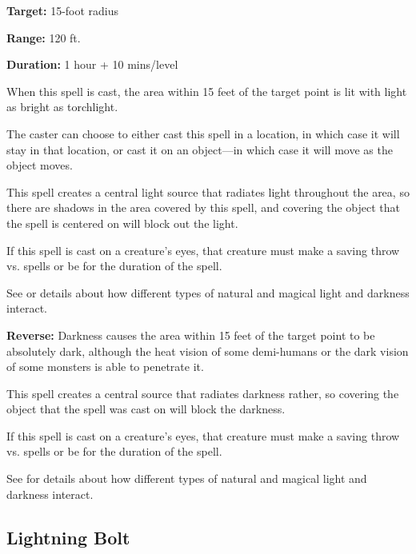 \begin{multicols*}{2}
{\textbf{Target:} 15-foot radius

\textbf{Range:} 120 ft.

\textbf{Duration:} 1 hour + 10 mins/level}

When this spell is cast, the area within 15 feet of the target point is lit with light as bright as torchlight.

The caster can choose to either cast this spell in a location, in which case it will stay in that location, or cast it on an object—in which case it will move as the object moves.

This spell creates a central light source that radiates light throughout the area, so there are shadows in the area covered by this spell, and covering the object that the spell is centered on will block out the light.

If this spell is cast on a creature’s eyes, that creature must make a saving throw vs. spells or be  for the duration of the spell.

See  or details about how different types of natural and magical light and darkness interact.

\textbf{Reverse:} \hypertarget{spell:Darkness}{Darkness} causes the area within 15 feet of the target point to be absolutely dark, although the heat vision of some demi-humans or the dark vision of some monsters is able to penetrate it.

This spell creates a central source that radiates darkness rather, so covering the object that the spell was cast on will block the darkness.

If this spell is cast on a creature’s eyes, that creature must make a saving throw vs. spells or be  for the duration of the spell.

See  for details about how different types of natural and magical light and darkness interact.

\subsection{Lightning Bolt}\label{spell:Lightning Bolt}


\end{multicols*}
